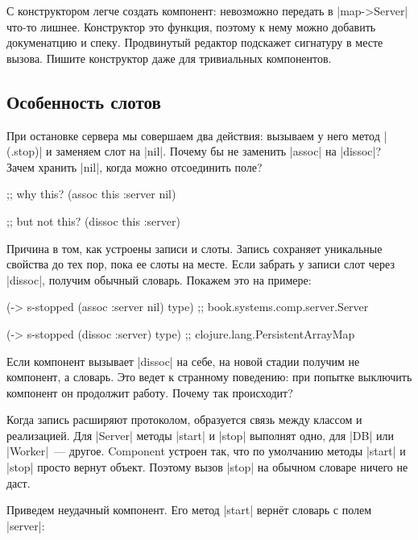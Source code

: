 С конструктором легче создать компонент: невозможно передать в
\spverb|map->Server| что-то лишнее. Конструктор это функция, поэтому к нему
можно добавить докуменатцию и спеку. Продвинутый редактор подскажет сигнатуру в
месте вызова. Пишите конструктор даже для тривиальных компонентов.

\subsection{Особенность слотов}

При остановке сервера мы совершаем два действия: вызываем у него метод
\spverb|(.stop)| и заменяем слот на \spverb|nil|. Почему бы не заменить
\spverb|assoc| на \spverb|dissoc|? Зачем хранить \spverb|nil|, когда можно
отсоединить поле?

\begin{english}
  \begin{clojure}
;; why this?
(assoc this :server nil)

;; but not this?
(dissoc this :server)
  \end{clojure}
\end{english}

Причина в том, как устроены записи и слоты. Запись сохраняет уникальные свойства
до тех пор, пока ее слоты на месте. Если забрать у записи слот через
\spverb|dissoc|, получим обычный словарь. Покажем это на примере:

\begin{english}
  \begin{clojure}
(-> s-stopped (assoc :server nil) type)
;; book.systems.comp.server.Server

(-> s-stopped (dissoc :server) type)
;; clojure.lang.PersistentArrayMap
  \end{clojure}
\end{english}

Если компонент вызывает \spverb|dissoc| на себе, на новой стадии получим не
компонент, а словарь. Это ведет к странному поведению: при попытке выключить
компонент он продолжит работу. Почему так происходит?

Когда запись расширяют протоколом, образуется связь между классом и
реализацией. Для \spverb|Server| методы \spverb|start| и \spverb|stop| выполнят
одно, для \spverb|DB| или \spverb|Worker|~--- другое. Component устроен так, что
по умолчанию методы \spverb|start| и \spverb|stop| просто вернут объект. Поэтому
вызов \spverb|stop| на обычном словаре ничего не даст.

Приведем неудачный компонент. Его метод \spverb|start| верн\"{е}т словарь с
полем \spverb|server|:

